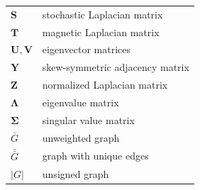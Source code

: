 \documentclass{article}
\begin{document}
\begin{longtable}{ll}
  $\mathbf S$ & stochastic Laplacian matrix \\
  $\mathbf T$ & magnetic Laplacian matrix \\
  $\mathbf U, \mathbf V$ & eigenvector matrices \\
  $\mathbf Y$ & skew-symmetric adjacency matrix \\
  $\mathbf Z$ & normalized Laplacian matrix \\
\midrule
  $\mathbf \Lambda$ & eigenvalue matrix \\
  $\mathbf \Sigma$ & singular value matrix \\
\midrule
  $\bar G$ & unweighted graph \\
  $\bar{\bar G}$ & graph with unique edges \\
  $|G|$ & unsigned graph 
\end{longtable}

 
\end{document}
